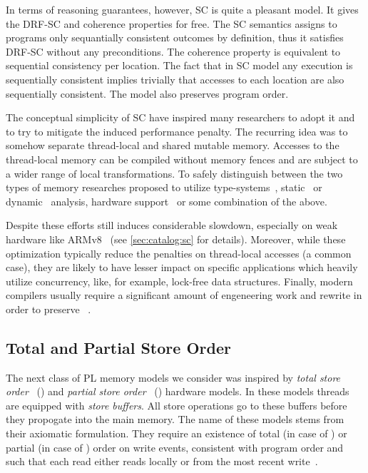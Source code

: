 In terms of reasoning guarantees, however, SC is quite a pleasant model. 
It gives the DRF-SC and coherence properties for free.
The SC semantics assigns to programs only sequantially consistent
outcomes by definition, thus it satisfies DRF-SC without any preconditions.
The coherence property is equivalent to sequential consistency per location.
The fact that in SC model any execution is sequentially consistent implies trivially
that accesses to each location are also sequentially consistent.
The model also preserves program order.

The conceptual simplicity of SC have inspired many researchers 
to adopt it and to try to mitigate the induced performance penalty.
The recurring idea was to somehow separate thread-local and shared mutable memory.
Accesses to the thread-local memory can be compiled 
without memory fences and are subject to a wider range 
of local transformations.
To safely distinguish between the two types of memory
researches proposed to utilize type-systems~\cite{Vollmer-al:PPoPP17},
static~\cite{Singh-al:ISCA12} or dynamic~\cite{Liu-al:PLDI19} analysis,
hardware support~\cite{Singh-al:ISCA12, Marino-al:PLDI10}
or some combination of the above. 

Despite these efforts \SC still induces considerable slowdown,
especially on weak hardware like ARMv8~\cite{Liu-al:PLDI19} 
(see \cref{sec:catalog:sc} for details).
Moreover, while these optimization typically reduce 
the penalties on thread-local accesses (a common case), 
they are likely to have lesser impact on specific 
applications which heavily utilize concurrency,
like, for example, lock-free data structures.
Finally, modern compilers usually require 
a significant amount of engeneering work and rewrite
in order to preserve \SC~\cite{Marino-al:PLDI11, Liu-al:PLDI19}.


\subsection{Total and Partial Store Order}

The next class of PL memory models we consider 
was inspired by \emph{total store order}~\cite{Sewell-al:CACM10} (\TSO) 
and \emph{partial store order}~\cite{Sparc:94} (\PSO) hardware models. 
In these models threads are equipped with \emph{store buffers}.
All store operations go to these buffers before they 
propogate into the main memory.
The name of these models stems from their axiomatic formulation. 
They require an existence of total (in case of \TSO) 
or partial (in case of \PSO) order on write events, 
consistent with program order and such that 
each read either reads locally or from 
the most recent write~\cite{Sewell-al:CACM10, Lahav-al:POPL16}. 

